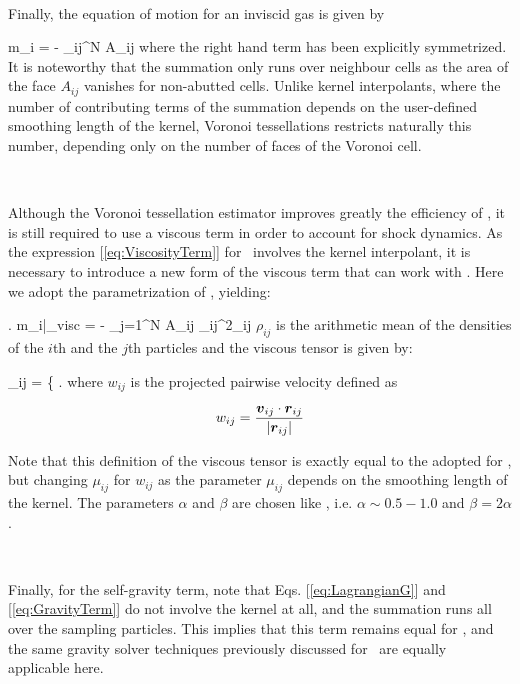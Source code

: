 \documentclass[a4,useAMS,usenatbib,usegraphicx,12pt]{article}
\begin{document}
\

Finally, the equation of motion for an inviscid gas is given by

{ m_i  = - \sum_{i\neq j}^N A_{ij} }
where the right hand term has been explicitly symmetrized. It is noteworthy that
the summation only runs over neighbour cells as the area of the face $A_{ij}$ 
vanishes for non-abutted cells. Unlike kernel interpolants, where the number of
contributing terms of the summation depends on the user-defined smoothing 
length of the kernel, Voronoi tessellations restricts naturally this number, 
depending only on the number of faces of the Voronoi cell.

\

Although the Voronoi tessellation estimator improves greatly the efficiency of 
\SPH, it is still required to use a viscous term in order to account for shock
dynamics. As the expression [\ref{eq:ViscosityTerm}] for \SPH\ involves the kernel
interpolant, it is necessary to introduce a new form of the viscous term that 
can work with \VPH. Here we adopt the parametrization of \citet{Hess10}, 
yielding:

{ \left. m_i\right|_{\mbox{\footnotesize visc}} =
- \sum_{j=1}^N A_{ij} {\rho}_{ij}^2\Pi_{ij} }
$\rho_{ij}$ is the arithmetic mean of the densities of the $i$th and the $j$th 
particles and the viscous tensor is given by:

{ \Pi_{ij} = \left\{ \right. }
where $w_{ij}$ is the projected pairwise velocity defined as

\[ w_{ij} = \frac{ \boldsymbol{ v }_{ij}\cdot \boldsymbol{ r }_{ij} }{|\boldsymbol{ r }_{ij}|} \]

Note that this definition of the viscous tensor is exactly equal to the adopted 
for \SPH, but changing $\mu_{ij}$ for $w_{ij}$ as the parameter $\mu_{ij}$ 
depends on the smoothing length of the kernel. The parameters $\alpha$ and 
$\beta$ are chosen like \SPH, i.e. $\alpha \sim 0.5-1.0$ and $\beta = 2\alpha$.

\

Finally, for the self-gravity term, note that Eqs. [\ref{eq:LagrangianG}] and 
[\ref{eq:GravityTerm}] do not involve the kernel at all, and the summation runs
all over the sampling particles. This implies that this term remains equal for 
\VPH, and the same gravity solver techniques previously discussed for \SPH\ are
equally applicable here.
\end{document}
